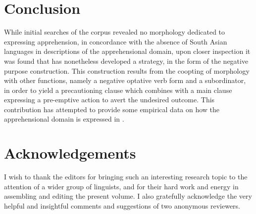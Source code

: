 \documentclass[output=paper,colorlinks,citecolor=brown]{langscibook}
\begin{document}
\section{Conclusion}
\label{lahaussois-conclusion}

While initial searches of the  corpus revealed no morphology dedicated to expressing apprehension, in concordance with the absence of South Asian languages in descriptions of the apprehensional domain, upon closer inspection it was found that  has nonetheless developed a strategy, in the form of the negative purpose construction. This construction results from the coopting of morphology with other functions, namely a negative optative verb form and a subordinator, in order to yield a precautioning clause which combines with a main clause expressing a pre-emptive action to avert the undesired outcome. This contribution has attempted to provide some empirical data on how the apprehensional domain is expressed in .

\section*{Acknowledgements}

I wish to thank the editors for bringing such an interesting research topic to the attention of a wider group of linguists, and for their hard work and energy in assembling and editing the present volume. I also gratefully acknowledge the very helpful and insightful comments and suggestions of two anonymous reviewers.
\end{document}
